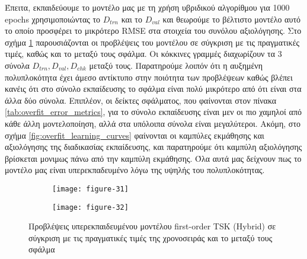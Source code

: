 \documentclass[11pt,a4paper,titlepage, oneside]{article}
\newlength\figureheight
\newlength\figurewidth
\begin{document}
			 Έπειτα, εκπαιδεύουμε το μοντέλο μας με τη χρήση υβριδικού αλγορίθμου για 1000 epochs χρησιμοποιώντας το $D_{trn}$ και το $D_{val}$ και θεωρούμε το βέλτιστο μοντέλο αυτό το οποίο προσφέρει το μικρότερο RMSE στα στοιχεία του συνόλου αξιολόγησης. Στο σχήμα \ref{fig:overfit_predictions} παρουσιάζονται οι προβλέψεις του μοντέλου σε σύγκριση με τις πραγματικές τιμές, καθώς και το μεταξύ τους σφάλμα. Οι κόκκινες γραμμές διαχωρίζουν τα 3 σύνολα $D_{trn}, D_{val}, D_{chk}$ μεταξύ τους.  Παρατηρούμε λοιπόν ότι η αυξημένη πολυπλοκότητα έχει άμεσο αντίκτυπο στην ποιότητα των προβλέψεων καθώς βλέπει κανέις ότι στο σύνολο εκπαίδευσης το σφάλμα είναι πολύ μικρότερο από ότι είναι στα άλλα δύο σύνολα. Επιπλέον, οι δείκτες σφάλματος, που φαίνονται στον πίνακα \ref{tab:overfit_error_metrics}, για το σύνολο εκπαίδευσης είναι μεν οι πιο χαμηλοί από κάθε άλλη μοντελοποίηση, αλλά στα υπόλοιπα σύνολα είναι μεγαλύτεροι. Ακόμη, στο σχήμα \ref{fig:overfit_learning_curves} φαίνονται οι καμπύλες εκμάθησης και αξιολόγησης της διαδικασίας εκπαίδευσης, και παρατηρούμε ότι καμπύλη αξιολόγησης βρίσκεται μονιμως πάνω από την καμπύλη εκμάθησης. Όλα αυτά μας δείχνουν πως το μοντέλο μας είναι υπερεκπαδευμένο λόγω της υψηλής του πολυπλοκότητας.
						
			\begin{figure}[h]
			 	\setlength{}
				\setlength{}	
				\centering
				\begin{subfigure}[b]{0.49\textwidth}
					\texttt{[image: figure-31]}
				\end{subfigure}
				\begin{subfigure}[b]{0.49\textwidth}
					\texttt{[image: figure-32]}
				\end{subfigure}
				\caption{Προβλέψεις υπερεκπαιδευμένου μοντέλου first-order TSK (Hybrid) σε σύγκριση με τις πραγματικές τιμές της χρονοσειράς και το μεταξύ τους σφάλμα}
				\label{fig:overfit_predictions}
			\end{figure}
			
\end{document}
